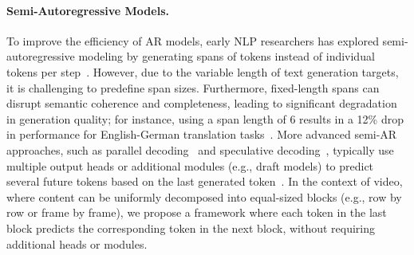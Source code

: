 \paragraph{Semi-Autoregressive Models.}
To improve the efficiency of AR models, early NLP researchers has explored semi-autoregressive modeling by generating spans of tokens instead of individual tokens per step~\citep{wang2018semi}. However, due to the variable length of text generation targets, it is challenging to predefine span sizes. Furthermore, fixed-length spans can disrupt semantic coherence and completeness, leading to significant degradation in generation quality; for instance, using a span length of 6 results in a 12\% drop in performance for English-German translation tasks~\citep{wang2018semi}.
More advanced semi-AR approaches, such as parallel decoding~\citep{Stern2018BlockwisePD} and speculative decoding~\citep{Xia2022SpeculativeDE}, typically use multiple output heads or additional modules (e.g., draft models) to predict several future tokens based on the last generated token~\citep{Gu2017NonAutoregressiveNM, Gloeckle2024BetterF}. 
In the context of video, where content can be uniformly decomposed into equal-sized blocks (e.g., row by row or frame by frame), we propose a framework where each token in the last block predicts the corresponding token in the next block, without requiring additional heads or modules. 


